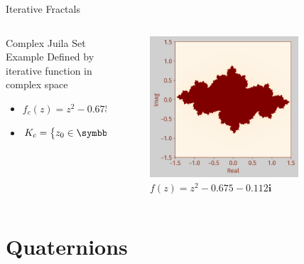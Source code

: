 \documentclass[aspectratio=169,t]{beamer}
\DeclarePairedDelimiter\abs{\lvert}{\rvert} %
\begin{document}
\begin{frame}[label={sec:orgec879ce}]{Iterative Fractals}
\begin{columns}
\begin{column}{0.55\columnwidth}
\begin{block}{Complex Juila Set Example}
Defined by iterative function in complex space

\begin{itemize}
\item \(f_c (z) = z^2 - 0.675 - 0.112\symbf{i}\)

\item \(K_c = \left\{ z_0 \in \symbb{C}: \abs{f^k_c \left(z_0 \right)} > B \text{ as } k \to \infty\right\}\)
\end{itemize}
\end{block}
\end{column}

\begin{column}{0.45\columnwidth}
\begin{figure}[htbp]
\centering
\includegraphics[width=0.80\textwidth]{./Figs/Fig_2v2.png}
\caption{\(f(z) = z^2 -0.675 - 0.112\symbf{i}\)}
\end{figure}
\end{column}
\end{columns}
\end{frame}

\section{Quaternions}
\label{sec:orgf569e58}
\end{document}
